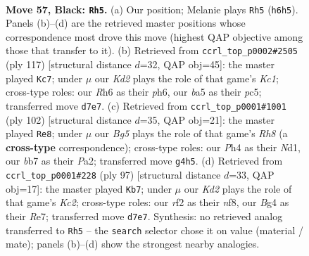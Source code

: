 \documentclass[11pt]{article}
\begin{document}
\clearpage

\begin{figure}[p]\centering
\begin{subfigure}{0.46\textwidth}\centering
\resizebox{\linewidth}{!}{%
\newchessgame
\chessboard[
  setfen={8/1B1k4/7r/B7/P5bp/1PK2p2/5R2/6N1 b - - 9 57},
  showmover=false,
  pgfstyle=straightmove, color=movearrow, markmove={h6-h5}
]}
\caption{}
\end{subfigure}\hfill
\begin{subfigure}{0.46\textwidth}\centering
\resizebox{\linewidth}{!}{%
\newchessgame
\chessboard[
  setfen={2k5/7p/7P/2P1Nb2/p2R4/P2p2K1/8/5r2 b - - 0 59},
  showmover=false,
  pgfstyle=straightmove, color=movearrow, markmove={c8-c7}
]}
\caption{}
\end{subfigure}
\\[4pt]
\begin{subfigure}{0.46\textwidth}\centering
\resizebox{\linewidth}{!}{%
\newchessgame
\chessboard[
  setfen={7R/2p1bP2/8/2k5/2p5/8/P5rP/1K1N4 w - - 5 52},
  showmover=false,
  pgfstyle=straightmove, color=movearrow, markmove={h8-e8}
]}
\caption{}
\end{subfigure}\hfill
\begin{subfigure}{0.46\textwidth}\centering
\resizebox{\linewidth}{!}{%
\newchessgame
\chessboard[
  setfen={5N2/2k1r3/R3p3/6bB/1P2b1P1/1K6/1P6/8 b - - 2 49},
  showmover=false,
  pgfstyle=straightmove, color=movearrow, markmove={c7-b7}
]}
\caption{}
\end{subfigure}
\caption{\textbf{Move 57, Black: \texttt{Rh5}.} (a) Our position; Melanie plays \texttt{Rh5} (\texttt{h6h5}). Panels (b)--(d) are the retrieved master positions whose correspondence most drove this move (highest QAP objective among those that transfer to it). (b) Retrieved from \texttt{ccrl\_top\_p0002\#2505} (ply 117) [structural distance $d$=32, QAP obj=45]: the master played \texttt{Kc7}; under $\mu$ our \emph{Kd2} plays the role of that game's \emph{Kc1}; cross-type roles: our \emph{R}h6 as their \emph{p}h6, our \emph{b}a5 as their \emph{p}c5; transferred move \texttt{d7e7}. (c) Retrieved from \texttt{ccrl\_top\_p0001\#1001} (ply 102) [structural distance $d$=35, QAP obj=21]: the master played \texttt{Re8}; under $\mu$ our \emph{Bg5} plays the role of that game's \emph{Rh8} (a \textbf{cross-type} correspondence); cross-type roles: our \emph{P}h4 as their \emph{N}d1, our \emph{b}b7 as their \emph{P}a2; transferred move \texttt{g4h5}. (d) Retrieved from \texttt{ccrl\_top\_p0001\#228} (ply 97) [structural distance $d$=33, QAP obj=17]: the master played \texttt{Kb7}; under $\mu$ our \emph{Kd2} plays the role of that game's \emph{Kc2}; cross-type roles: our \emph{r}f2 as their \emph{n}f8, our \emph{B}g4 as their \emph{R}e7; transferred move \texttt{d7e7}. Synthesis: no retrieved analog transferred to \texttt{Rh5} -- the \texttt{search} selector chose it on value (material / mate); panels (b)--(d) show the strongest nearby analogies.}
\label{fig:thought-m113}
\end{figure}
\end{document}
